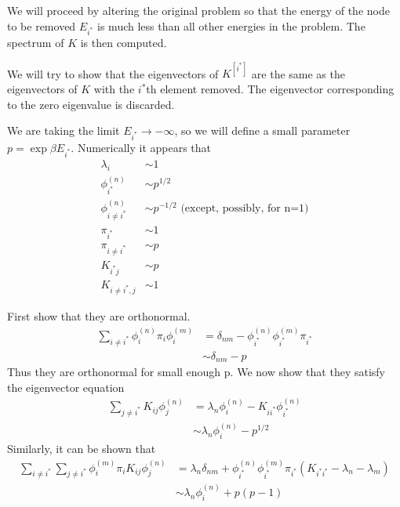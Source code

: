 \documentclass[a4paper]{article}
\newcommand{\evec}[2]{\phi^{(#2)}_{#1}}
\newcommand{\subK}{K^{[i^{*}]}}
\begin{document}
We will proceed by altering the original problem so that the energy of the node to be removed $E_{i^{*}}$
is much less than all other energies in the problem.  The spectrum of $K$ is then computed.

We will try to show that the eigenvectors of $\subK{}$ are the same as the eigenvectors of $K$ with 
the $i^{*}$th element removed. The eigenvector corresponding to the zero eigenvalue is discarded.

We are taking the limit $E_{i^{*}} \to -\infty$, so we will define a small parameter $p = \exp{\beta E_{i^{*}}}$.
Numerically it appears that
\begin{align}
\lambda_{i} &\sim 1 \\
\evec{i^{*}}{n} &\sim p^{1/2} \\
\evec{i\ne i^{*}}{n} &\sim p^{-1/2} \text{  (except, possibly, for n=1)} \\
\pi_{i^{*}} &\sim 1 \\
\pi_{i\ne i^{*}} &\sim p \\
K_{i^{*} j} &\sim p \\
K_{i\ne i^{*}, j} &\sim 1
\end{align}

First show that they are orthonormal.
\begin{align}
\sum_{i\ne i^{*}} \evec{i}{n} \pi_i \evec{i}{m} &= \delta_{nm} - \evec{i^{*}}{n} \evec{i^{*}}{m} \pi_{i^{*}} \\
& \sim \delta_{nm} - p
\end{align}
Thus they are orthonormal for small enough p.  We now show that they satisfy the eigenvector equation
\begin{align}
\sum_{j\ne i^{*}} K_{ij} \evec{j}{n}  &=
\lambda_n \evec{i}{n} - K_{i i^{*}} \evec{i^{*}}{n} \\
& \sim \lambda_n \evec{i}{n} - p^{1/2}
\end{align}
Similarly, it can be shown that
\begin{align}
\sum_{i\ne i^{*}} 
\sum_{j\ne i^{*}} 
\evec{i}{m} \pi_{i}
K_{ij} \evec{j}{n} 
&= \lambda_n \delta_{nm} + \evec{i^{*}}{n} \evec{i^{*}}{m} \pi_{i^{*}} (K_{i^{*} i^{*}} - \lambda_n - \lambda_m)
\\
& \sim \lambda_n \evec{i}{n} + p (p - 1)
\end{align}
\end{document}
